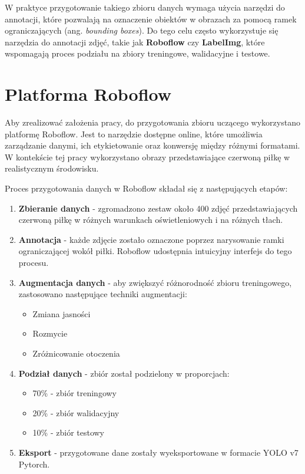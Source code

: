\documentclass[a4paper,twoside,12pt]{book}
\begin{document}
W praktyce przygotowanie takiego zbioru danych wymaga użycia narzędzi do annotacji, które pozwalają na oznaczenie obiektów w obrazach za pomocą ramek ograniczających (ang. \textit{bounding boxes}). Do tego celu często wykorzystuje się narzędzia do annotacji zdjęć, takie jak \textbf{Roboflow} czy \textbf{LabelImg}, które wspomagają proces podziału na zbiory treningowe, walidacyjne i testowe.


\section{Platforma Roboflow}
Aby zrealizować założenia pracy, do przygotowania zbioru uczącego wykorzystano platformę Roboflow. Jest to narzędzie dostępne online, które umożliwia zarządzanie danymi, ich etykietowanie oraz konwersję między różnymi formatami. W kontekście tej pracy wykorzystano obrazy przedstawiające czerwoną piłkę w realistycznym środowisku.

Proces przygotowania danych w Roboflow składał się z następujących etapów:

\begin{enumerate}
	\item \textbf{Zbieranie danych} - zgromadzono zestaw około 400 zdjęć przedstawiających czerwoną piłkę w różnych warunkach oświetleniowych i na różnych tłach.
	
	\item \textbf{Annotacja} - każde zdjęcie zostało oznaczone poprzez narysowanie ramki ograniczającej wokół piłki. Roboflow udostępnia intuicyjny interfejs do tego procesu.
	
	\item \textbf{Augmentacja danych} - aby zwiększyć różnorodność zbioru treningowego, zastosowano następujące techniki augmentacji:
	\begin{itemize}
		\item Zmiana jasności 
		\item Rozmycie
		\item Zróżnicowanie otoczenia
	\end{itemize}
	
	\item \textbf{Podział danych} - zbiór został podzielony w proporcjach:
	\begin{itemize}
		\item 70\% - zbiór treningowy
		\item 20\% - zbiór walidacyjny
		\item 10\% - zbiór testowy
	\end{itemize}
	
	\item \textbf{Eksport} - przygotowane dane zostały wyeksportowane w formacie YOLO v7 Pytorch.
\end{enumerate}
\end{document}
